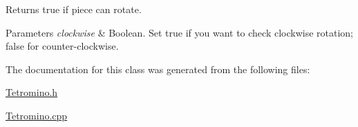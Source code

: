 Returns true if piece can rotate. 


\begin{DoxyParams}{Parameters}
{\em clockwise} & Boolean. Set true if you want to check clockwise rotation; false for counter-\/clockwise. \\
\hline
\end{DoxyParams}


The documentation for this class was generated from the following files\-:\begin{DoxyCompactItemize}
\item 
\hyperlink{_tetromino_8h}{Tetromino.\-h}\item 
\hyperlink{_tetromino_8cpp}{Tetromino.\-cpp}\end{DoxyCompactItemize}
